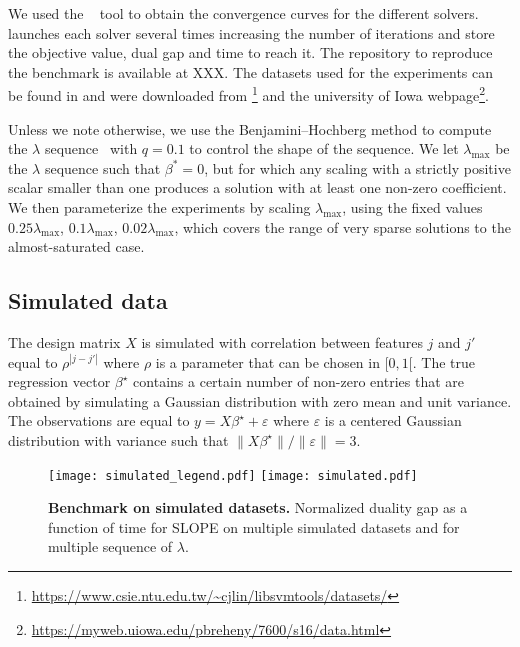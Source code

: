 We used the ~\parencite{moreau2022benchopt} tool to obtain the convergence curves for the different solvers.
 launches each solver several times increasing the number of iterations and store the objective value, dual gap and time to reach it.
The repository to reproduce the benchmark is available at XXX.
The datasets used for the experiments can be found in  and were downloaded from \footnote{\url{https://www.csie.ntu.edu.tw/~cjlin/libsvmtools/datasets/}} and the university of Iowa webpage\footnote{\url{https://myweb.uiowa.edu/pbreheny/7600/s16/data.html}}.

Unless we note otherwise, we use the Benjamini--Hochberg method to compute the \(\lambda\) sequence~\parencite{bogdan2015} with \(q=0.1\) to control the shape of the sequence.
We let \(\lambda_\text{max}\) be the \(\lambda\) sequence such that \(\beta^* = 0\), but for which any scaling with a strictly positive scalar smaller than one produces a solution with at least one non-zero coefficient.
We then parameterize the experiments by scaling \(\lambda_\text{max}\), using the fixed values \(0.25 \lambda_\text{max}\), \(0.1 \lambda_\text{max}\), \(0.02 \lambda_\text{max}\), which covers the range of very sparse solutions to the almost-saturated case.

\subsection{Simulated data}

The design matrix $X$ is simulated with correlation between features $j$ and $j'$ equal to $\rho^{|j-j'|}$ where $\rho$ is a parameter that can be chosen in $[0, 1[$.
The true regression vector $\beta^\star$ contains a certain number of non-zero entries that are obtained by simulating a Gaussian distribution with zero mean and unit variance.
The observations are equal to $y=X\beta^\star + \varepsilon$ where $\varepsilon$ is a centered Gaussian distribution with variance such that $\lVert X\beta^\star\rVert / \lVert \varepsilon \rVert = 3$.
\begin{figure*}[htb]
  \centering
  \texttt{[image: simulated\_legend.pdf]}
  \texttt{[image: simulated.pdf]}
  \caption{\textbf{Benchmark on simulated datasets.} Normalized duality gap as a function of time for SLOPE on multiple simulated datasets and for multiple sequence of $\lambda$.}
  \label{fig:simulated}
\end{figure*}


